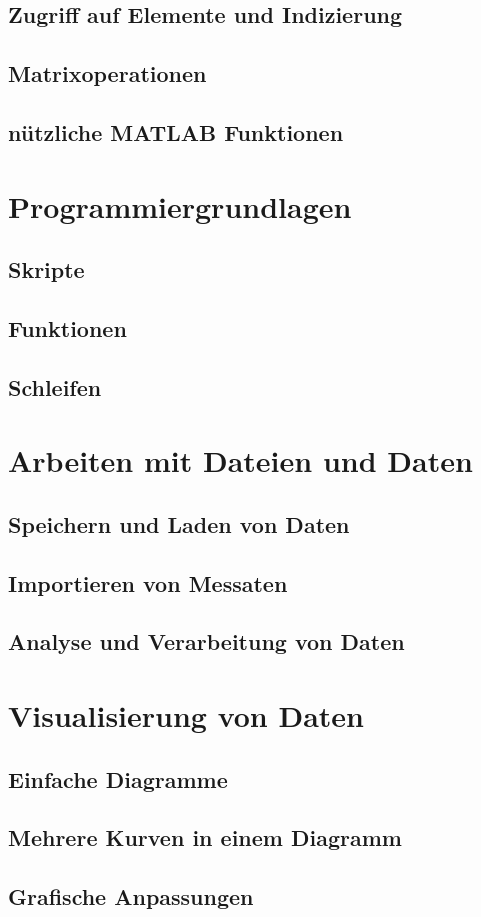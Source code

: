 \documentclass[12pt, a4paper, twoside]{article}
\begin{document}
        \subsection{Zugriff auf Elemente und Indizierung}
        \subsection{Matrixoperationen}
        \subsection{nützliche MATLAB Funktionen}
    \section{Programmiergrundlagen}
        \subsection{Skripte}
        \subsection{Funktionen}
        \subsection{Schleifen}
    \section{Arbeiten mit Dateien und Daten}
        \subsection{Speichern und Laden von Daten}
        \subsection{Importieren von Messaten}
        \subsection{Analyse und Verarbeitung von Daten}
    \section{Visualisierung von Daten}
        \subsection{Einfache Diagramme}
        \subsection{Mehrere Kurven in einem Diagramm}
        \subsection{Grafische Anpassungen}
    
\end{document}
